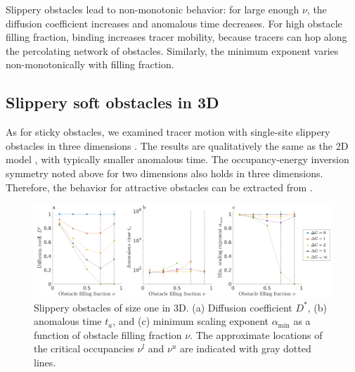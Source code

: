 Slippery obstacles lead to non-monotonic behavior: for large enough $\nu$, the
diffusion coefficient increases and anomalous time decreases. For high obstacle
filling fraction, binding increases tracer mobility, because tracers can hop
along the percolating network of obstacles.  Similarly, the minimum exponent
varies non-monotonically with filling fraction. 

\subsection{Slippery soft obstacles in 3D}

As for sticky obstacles, we examined tracer motion with single-site slippery
obstacles in three dimensions . The results are
qualitatively the same as the 2D model , with typically
smaller anomalous time.  The occupancy-energy inversion symmetry noted above for
two dimensions also holds in three dimensions. Therefore, the behavior for
attractive obstacles can be extracted from .

\begin{figure}[!ht]
  \begin{center}
	  \includegraphics[width=150mm]{figs/ch02_soft/soft_slippery_3d.png}
  \end{center}
	\caption[Slippery obstacles in 3D]
    {Slippery obstacles of size one in 3D. (a) Diffusion
    coefficient $D^*$, (b) anomalous time $ t_a $, and (c)
    minimum scaling exponent $\alpha_{\min}$ as a function of
    obstacle filling fraction $\nu$. The approximate locations of the critical
    occupancies $ \nu^l $ and $ \nu^u $ are indicated with gray dotted
    lines. }\label{fig:slippery_3d}
\end{figure}

